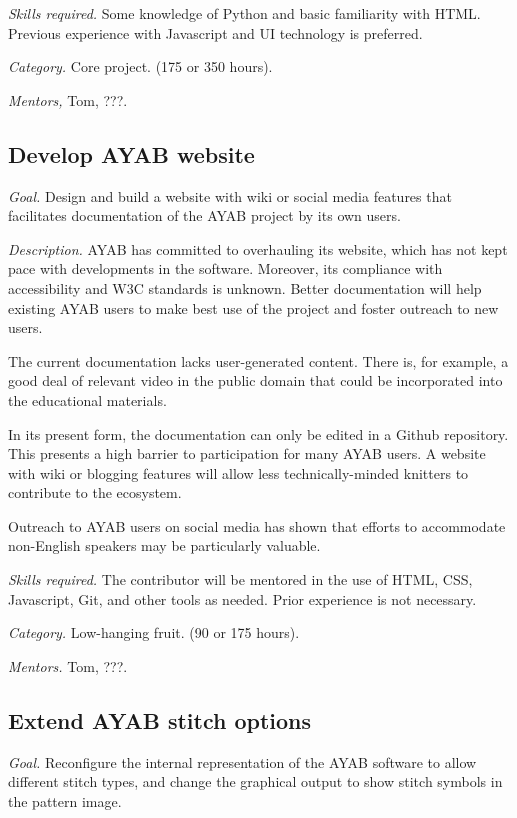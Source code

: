 \documentclass{article}
\begin{document}
\textit{Skills required.} Some knowledge of Python and basic familiarity with HTML. Previous experience with Javascript and UI technology is preferred.

\textit{Category.} Core project. (175 or 350 hours).

\textit{Mentors,} Tom, ???.


\subsection{Develop AYAB website} 

\textit{Goal.} Design and build a website with wiki or social media features that facilitates documentation of the AYAB project by its own users. 

\textit{Description.} AYAB has committed to overhauling its website, which has not kept pace with developments in the software. Moreover, its compliance with accessibility and W3C standards is unknown. Better documentation will help existing AYAB users to make best use of the project and foster outreach to new users. 

The current documentation lacks user-generated content. There is, for example, a good deal of relevant video in the public domain that could be incorporated into the educational materials.

In its present form, the documentation can only be edited in a Github repository. This presents a high barrier to participation for many AYAB users. A website with wiki or blogging features will allow less technically-minded knitters to contribute to the ecosystem.

Outreach to AYAB users on social media has shown that efforts to accommodate non-English speakers may be particularly valuable.

\textit{Skills required.} The contributor will be mentored in the use of HTML, CSS, Javascript, Git, and other tools as needed. Prior experience is not necessary.

\textit{Category.} Low-hanging fruit. (90 or 175 hours).

\textit{Mentors.} Tom, ???.


\subsection{Extend AYAB stitch options} 

\textit{Goal.} Reconfigure the internal representation of the AYAB software to allow different stitch types, and change the graphical output to show stitch symbols in the pattern image.
\end{document}
